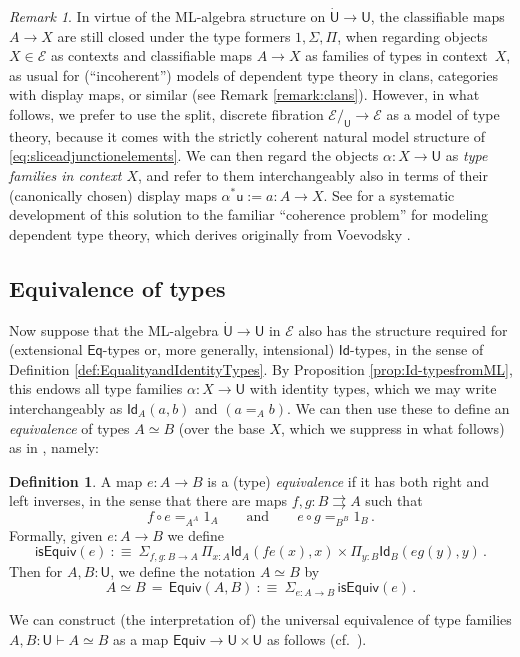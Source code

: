 \documentclass[12pt,reqno]{amsart}
\newcommand{\EE}{\ensuremath{\mathcal{E}}}
\renewcommand{\to}{\ensuremath{\rightarrow}}
\newcommand{\tto}{\ensuremath{\rightrightarrows}}
\newcommand{\Id}{\mathsf{Id}}
\renewcommand{\t}{\ensuremath{\mathsf{u}}}
\newcommand{\T}{\ensuremath{\mathsf{U}}}
\newcommand{\TT}{\ensuremath{\dot{\mathsf{U}}}}
\theoremstyle{remark}
\newtheorem{remark}[theorem]{Remark}
\theoremstyle{definition}
\newtheorem{definition}[theorem]{Definition}
\begin{document}
\begin{remark}\label{remark:classifyingmaps}
In virtue of the ML-algebra structure on $\TT\to\T$, the classifiable maps $A\to X$ are still closed under the type formers $1, \Sigma, \Pi$, when  regarding objects $X \in \EE$ as contexts and classifiable maps $A\to X$ as families of types in context~$X$, as usual for (``incoherent'') models of dependent type theory in clans, categories with display maps, or similar (see Remark \ref{remark:clans}).  However, in what follows, we prefer to use the split, discrete fibration $\EE/_\T \to \EE$ as a model of type theory, because it comes with the strictly coherent natural model structure of \eqref{eq:sliceadjunctionelements}.  We can then regard the objects $\alpha : X \to \T$ as \emph{type families in context $X$}, and refer to them interchangeably also in terms of their (canonically chosen) display maps $\alpha^*\t := a : A \to X$.  See \cite[\S 1--3]{AGH} for a systematic development of this solution to the familiar ``coherence problem'' \cite{Hofmann:1994} for modeling dependent type theory, which derives originally from Voevodsky \cite{KL:VV}.  
\end{remark}

\subsection{Equivalence of types}\label{sec:equivalence}

Now suppose that the ML-algebra $\TT \to \T$ in $\EE$ also has the structure required for (extensional $\mathsf{Eq}$-types or, more generally, intensional) $\Id{}$-types, in the sense of Definition \ref{def:EqualityandIdentityTypes}.  By Proposition \ref{prop:Id-typesfromML}, this endows all type families $\alpha : X \to \T$ with identity types, which we may write interchangeably as $\Id_{A}(a, b)$ and $(a =_A b)$.   We can then use these to define an \emph{equivalence} of types $A\simeq B$ (over the base $X$, which we suppress in what follows) as in \cite[\S 4.3]{HoTTbook}, namely:
%
\begin{definition}
 A map $e : A\to B$ is a (type) \emph{equivalence} if it has both right and left inverses, in the sense that there are maps $f, g : B\tto A$ such that 
 \[
f\circ e =_{A^A} 1_A \qquad\text{and}\qquad  e\circ g =_{B^B} 1_B  \,.
 \]
 Formally, given $e : A\to B$ we define 
 \[
 \mathsf{isEquiv}(e)\ :\equiv\ \Sigma_{f, g: B\to A}\,  \Pi_{x:A}\Id_{A}(fe(x) , x) \times \Pi_{y:B}\Id_{B}(eg(y), y) \,.
 \]
Then for $A, B: \T$, we define the notation $A \simeq B$ by
 \begin{equation}\label{eq:typeequivalence}
A \simeq B\, =\, \mathsf{Equiv}(A,B)\ :\equiv\  \Sigma_{e : A\to B}\, \mathsf{isEquiv}(e)\,.
 \end{equation}
\end{definition}
We can construct (the interpretation of) the universal equivalence of type families $A, B : \T \vdash A \simeq B$ as a map $\mathsf{Equiv} \to \T \times \T$ as follows (cf.\ \cite{KL:VV}).
\end{document}
